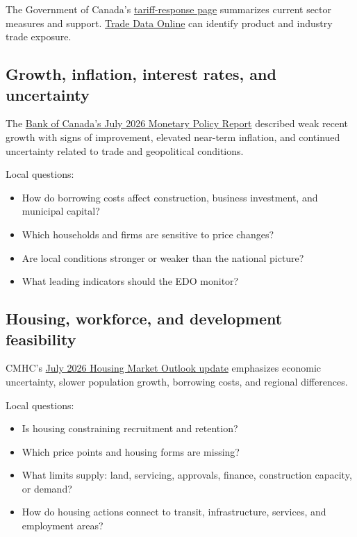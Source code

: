 \documentclass[11pt,letterpaper,oneside,openany]{book}
\begin{document}
The Government of Canada's \href{https://www.canada.ca/en/department-finance/programs/international-trade-finance-policy/canadas-tariff-responses.html}{tariff-response page} summarizes current sector measures and support. \href{https://ised-isde.canada.ca/site/trade-data-online/en}{Trade Data Online} can identify product and industry trade exposure.


\subsection[Growth, inflation, interest rates, and uncertainty]{Growth, inflation, interest rates, and uncertainty}
The \href{https://www.bankofcanada.ca/publications/mpr/mpr-2026-07-15/}{Bank of Canada's July 2026 Monetary Policy Report} described weak recent growth with signs of improvement, elevated near-term inflation, and continued uncertainty related to trade and geopolitical conditions.


Local questions:


\begin{itemize}
\item How do borrowing costs affect construction, business investment, and municipal capital?
\item Which households and firms are sensitive to price changes?
\item Are local conditions stronger or weaker than the national picture?
\item What leading indicators should the EDO monitor?
\end{itemize}


\subsection[Housing, workforce, and development feasibility]{Housing, workforce, and development feasibility}
CMHC's \href{https://www.cmhc-schl.gc.ca/media-newsroom/news-releases/2026/economic-uncertainty-continue-weighing-housing-market-cmhc}{July 2026 Housing Market Outlook update} emphasizes economic uncertainty, slower population growth, borrowing costs, and regional differences.


Local questions:


\begin{itemize}
\item Is housing constraining recruitment and retention?
\item Which price points and housing forms are missing?
\item What limits supply: land, servicing, approvals, finance, construction capacity, or demand?
\item How do housing actions connect to transit, infrastructure, services, and employment areas?
\end{itemize}
\end{document}
